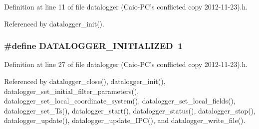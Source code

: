 Definition at line 11 of file datalogger (\-Caio-\/\-P\-C's conflicted copy 2012-\/11-\/23).\-h.



Referenced by datalogger\-\_\-init().

\hypertarget{datalogger_01_07Caio-PC's_01conflicted_01copy_012012-11-23_08_8h_a684c343d340004b77ca2b782934c96ca}{
\subsubsection[{D\-A\-T\-A\-L\-O\-G\-G\-E\-R\-\_\-\-I\-N\-I\-T\-I\-A\-L\-I\-Z\-E\-D}]{\setlength{\rightskip}{0pt plus 5cm}\#define D\-A\-T\-A\-L\-O\-G\-G\-E\-R\-\_\-\-I\-N\-I\-T\-I\-A\-L\-I\-Z\-E\-D~1}}\label{datalogger_01_07Caio-PC's_01conflicted_01copy_012012-11-23_08_8h_a684c343d340004b77ca2b782934c96ca}


Definition at line 27 of file datalogger (\-Caio-\/\-P\-C's conflicted copy 2012-\/11-\/23).\-h.



Referenced by datalogger\-\_\-close(), datalogger\-\_\-init(), datalogger\-\_\-set\-\_\-initial\-\_\-filter\-\_\-parameters(), datalogger\-\_\-set\-\_\-local\-\_\-coordinate\-\_\-system(), datalogger\-\_\-set\-\_\-local\-\_\-fields(), datalogger\-\_\-set\-\_\-\-Ts(), datalogger\-\_\-start(), datalogger\-\_\-status(), datalogger\-\_\-stop(), datalogger\-\_\-update(), datalogger\-\_\-update\-\_\-\-I\-P\-C(), and datalogger\-\_\-write\-\_\-file().

